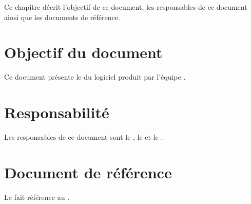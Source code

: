 	Ce chapitre décrit l'objectif de ce document, les responsables de ce document ainsi que les documents de référence.

\section{Objectif du document}
	Ce document présente le \JTI{} du logiciel produit par l'équipe \nomEquipe{}.
	
\section{Responsabilité}
	Les responsables de ce document sont le \CP, le \RQ{} et le \RD.
	
\section{Document de référence}
	Le \JTI{} fait référence au \PTI.
